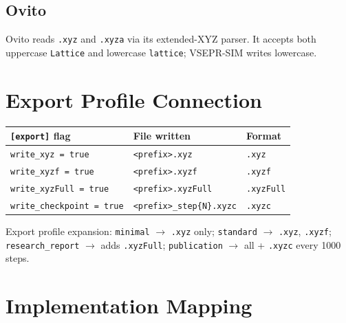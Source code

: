 \documentclass[11pt, a4paper, oneside]{article}
\begin{document}
\subsection{Ovito}
Ovito reads \texttt{.xyz} and \texttt{.xyza} via its extended-XYZ parser.
It accepts both uppercase \texttt{Lattice} and lowercase \texttt{lattice};
VSEPR-SIM writes lowercase.

\section{Export Profile Connection}
\label{sec:export}

\begin{center}
\begin{tabular}{lll}
  \toprule
  \texttt{[export]} flag & File written & Format \\
  \midrule
  \texttt{write\_xyz = true}        & \texttt{<prefix>.xyz}            & \texttt{.xyz} \\
  \texttt{write\_xyzf = true}       & \texttt{<prefix>.xyzf}           & \texttt{.xyzf} \\
  \texttt{write\_xyzFull = true}    & \texttt{<prefix>.xyzFull}        & \texttt{.xyzFull} \\
  \texttt{write\_checkpoint = true} & \texttt{<prefix>\_step\{N\}.xyzc}& \texttt{.xyzc} \\
  \bottomrule
\end{tabular}
\end{center}

Export profile expansion:
\texttt{minimal} $\to$ \texttt{.xyz} only;
\texttt{standard} $\to$ \texttt{.xyz}, \texttt{.xyzf};
\texttt{research\_report} $\to$ adds \texttt{.xyzFull};
\texttt{publication} $\to$ all + \texttt{.xyzc} every 1000 steps.

\section{Implementation Mapping}
\label{sec:impl}
\end{document}
